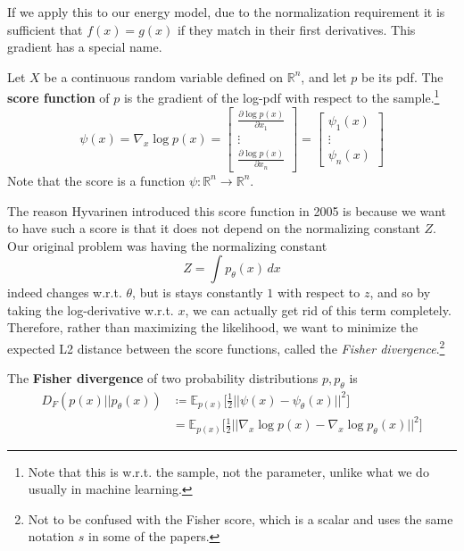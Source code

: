     If we apply this to our energy model, due to the normalization requirement it is sufficient that $f(x) = g(x)$ if they match in their first derivatives. This gradient has a special name. 

    \begin{definition}[Score]
      Let $X$ be a continuous random variable defined on $\mathbb{R}^n$, and let $p$ be its pdf. The \textbf{score function} of $p$ is the gradient of the log-pdf with respect to the sample.\footnote{Note that this is w.r.t. the sample, not the parameter, unlike what we do usually in machine learning.}
      \begin{equation}
        \psi (x) = \nabla_x \log p(x) = \begin{bmatrix} \frac{\partial \log{p(x)}}{\partial x_1} \\ \vdots \\ \frac{\partial \log{p(x)}}{\partial x_n} \end{bmatrix} =  
        \begin{bmatrix}
          \psi_1 (x) \\ \vdots \\ \psi_n (x)
        \end{bmatrix} 
      \end{equation}
      Note that the score is a function $\psi: \mathbb{R}^n \rightarrow \mathbb{R}^n$. 
    \end{definition} 

    The reason Hyvarinen introduced this score function in 2005 is because we want to have such a score is that it does not depend on the normalizing constant $Z$. Our original problem was having the normalizing constant 
    \begin{equation}
      Z = \int p_\theta (x) \,dx
    \end{equation} 
    indeed changes w.r.t. $\theta$, but is stays constantly $1$ with respect to $z$, and so by taking the log-derivative w.r.t. $x$, we can actually get rid of this term completely. \cite{orig_score} Therefore, rather than maximizing the likelihood, we want to minimize the expected L2 distance between the score functions, called the \textit{Fisher divergence}.\footnote{Not to be confused with the Fisher score, which is a scalar and uses the same notation $s$ in some of the papers.} 

    \begin{definition}
      The \textbf{Fisher divergence} of two probability distributions $p, p_\theta$ is 
      \begin{align}
        D_F (p(x) || p_\theta (x)) & \coloneqq \mathbb{E}_{p(x)} \bigg[ \frac{1}{2} || \psi(x) - \psi_\theta(x) ||^2 \bigg] \\
                                   & = \mathbb{E}_{p(x)} \bigg[ \frac{1}{2} || \nabla_x \log p(x) - \nabla_x \log p_\theta (x) ||^2 \bigg]
      \end{align}
    \end{definition} 

